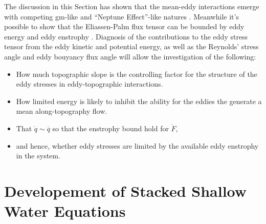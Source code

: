 \documentclass[12pt,a4paper]{report}
\newcommand*\thkmean[1]{\overline{#1}}
\newcommand*\spec[1]{\mathring{#1}}
\begin{document}
The discussion in this Section has shown that the mean-eddy interactions 
emerge with competing \gls{gm}-like and ``Neptune Effect''-like natures
\cite{adcock2000interactions}. Meanwhile  it's possible to show that
the Eliassen-Palm flux tensor can be bounded by eddy energy and eddy enstrophy
\cite{marshall2012framework}.
Diagnosis of the contributions to the eddy stress tensor from
the eddy kinetic and potential energy, as well as the Reynolds' stress angle and eddy bouyancy flux angle will allow the investigation of the following:
\begin{itemize} 
		\item How much topographic slope is the controlling factor for the structure of the eddy stresses in eddy-topographic interactions.
		\item How limited energy is likely to inhibit the ability for the eddies the
			generate a mean along-topography flow.
	    \item That $\spec{q} \sim \thkmean{q}$ so that the enstrophy bound hold for $\spec{F}$,
		\item and hence, whether eddy stresses are limited by the available eddy enstrophy in the system.
\end{itemize} 
 

\chapter{Developement of Stacked Shallow Water Equations}
\label{sweq}
\end{document}

